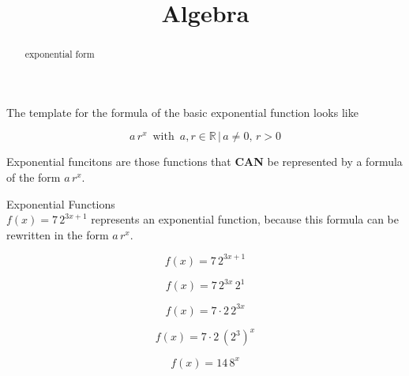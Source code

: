 \documentclass{ximera}
\title{Algebra}
\begin{document}
\begin{abstract}
exponential form
\end{abstract}
\maketitle










The template for the formula of the basic exponential function looks like



\[  a \, r^x   \, \text{ with } \,  a, r \in \mathbb{R} \, | \,  a \ne 0, \, r > 0   \]




Exponential funcitons are those functions that \textbf{\textcolor{red!80!black}{CAN}} be represented by a formula of the form $a \, r^x$.
















\begin{example}  Exponential Functions \\



$f(x) = 7 \, 2^{3x+1} $ represents an exponential function, because this formula can be rewritten in the form $a \, r^x$.   \\


\begin{explanation}


\[
f(x) = 7 \, 2^{3x+1}
\]


\[
f(x) = 7 \, 2^{3x}  \, 2^1
\]

\[
f(x) = 7 \cdot 2 \, 2^{3x} 
\]

\[
f(x) = 7 \cdot 2 \, (2^3)^x 
\]

\[
f(x) = 14 \, 8^x 
\]


\end{explanation}

\end{example}
\end{document}
